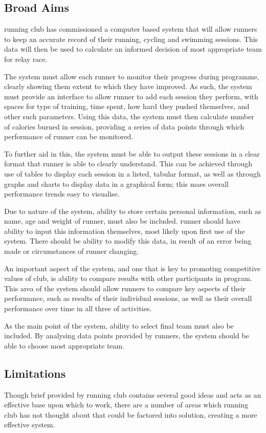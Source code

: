 \documentclass{article}[12pt,a4paper]
\begin{document}
\subsection{Broad Aims}
running club has commissioned  a computer based system that will allow runners to keep an accurate record of their running, cycling and swimming sessions. This data will then be used to calculate an informed decision of most appropriate team for relay race.

The system must allow each runner to monitor their progress during programme, clearly showing them extent to which they have improved. As such, the system must provide an interface to allow runner to add each session they perform, with spaces for type of training, time spent, how hard they pushed themselves, and other such parameters. Using this data, the system must then calculate number of calories burned in session, providing a series of data points through which performance of runner can be monitored.

To further aid in this, the system must be able to output these sessions in a clear format that runner is able to clearly understand. This can be achieved through use of tables to display each session in a listed, tabular format, as well as through graphs and charts to display data in a graphical form; this maes overall performance trends easy to visualise.

Due to nature of the system, ability to store certain personal information, such as name, age and weight of runner, must also be included. runner should have ability to input this information themselves, most likely upon first use of the system. There should be ability to modify this data, in result of an error being made or circumstances of runner changing.

An important aspect of the system, and one that is key to promoting competitive values of club, is ability to compare results with other participants in program. This area of the system should allow runners to compare key aspects of their performance, such as results of their individual sessions, as well as their overall performance over time in all three of activities.

As the main point of the system, ability to select final team must also be included. By analysing data points provided by runners, the system should be able to choose most appropriate team.

\subsection{Limitations}
Though brief provided by running club contains several good ideas and acts as an effective base upon which to work, there are a number of areas which running club has not thought about that could be factored into solution, creating a more effective system. 
\end{document}

